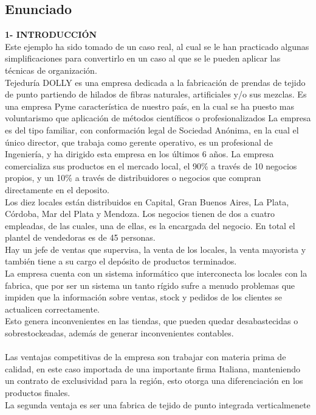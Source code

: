 \documentclass[a4paper,10pt,titlepage]{article}
\begin{document}
\subsection{Enunciado}
\textbf{1- INTRODUCCI\'ON}\\
Este ejemplo ha sido tomado de un caso real, al cual se le han practicado algunas
simplificaciones para convertirlo en un caso al que se le pueden aplicar las técnicas
de organización.\\
Tejeduría DOLLY es una empresa dedicada a la fabricación de prendas de tejido
de punto partiendo de hilados de fibras naturales, artificiales y/o sus mezclas.
Es una empresa Pyme característica de nuestro país, en la cual se ha puesto mas
voluntarismo que aplicación de métodos científicos o profesionalizados
La empresa es del tipo familiar, con conformación legal de Sociedad Anónima, en
la cual el único director, que trabaja como gerente operativo, es un profesional de
Ingeniería, y ha dirigido esta empresa en los últimos 6 años.
La empresa comercializa sus productos en el mercado local, el 90\% a través de 10
negocios propios, y un 10\% a través de distribuidores o negocios que compran
directamente en el deposito.\\
Los diez locales están distribuidos en Capital, Gran Buenos Aires, La Plata,
Córdoba, Mar del Plata y Mendoza. Los negocios tienen de dos a cuatro
empleadas, de las cuales, una de ellas, es la encargada del negocio. En total el
plantel de vendedoras es de 45 personas.\\
Hay un jefe de ventas que supervisa, la venta de los locales, la venta mayorista y
también tiene a su cargo el depósito de productos terminados.\\
La empresa cuenta con un sistema informático que interconecta los locales con la
fabrica, que por ser un sistema un tanto rígido sufre a menudo problemas que
impiden que la información sobre ventas, stock y pedidos de los clientes se
actualicen correctamente.\\
Esto genera inconvenientes en las tiendas, que pueden quedar desabastecidas o
sobrestockeadas, además de generar inconvenientes contables.\\ \\
Las ventajas competitivas de la empresa son trabajar con materia prima de calidad,
en este caso importada de una importante firma Italiana, manteniendo un contrato
de exclusividad para la región, esto otorga una diferenciación en los productos
finales.\\
La segunda ventaja es ser una fabrica de tejido de punto integrada verticalmenete
\end{document}
